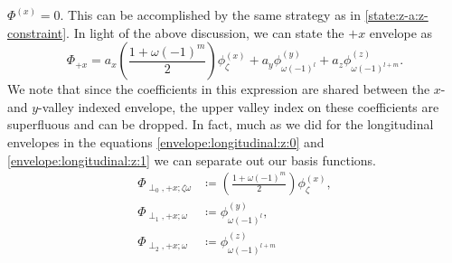 $\Phi^{\left(x\right)} = 0$. This can be accomplished by the same strategy as in
\eqref{state:z-a:z-constraint}. In light of the above discussion, we can state
the $+x$ envelope as 
\begin{equation}
\Phi_{+x}
  =
    a_{x}
    \left(\frac{1+\omega\left(-1\right)^{m}}{2}\right)
    \phi_{ \zeta }^{\left(x\right)}
      +
    a_{y}
    \phi_{ \omega\left(-1\right)^{l} }^{\left(y\right)}
      +
    a_{z}
    \phi_{ \omega\left(-1\right)^{l+m} }^{\left(z\right)}
.
\end{equation}
We note that since the coefficients in this expression are shared between the
$x$- and $y$-valley indexed envelope, the upper valley index on these
coefficients are superfluous and can be dropped. In fact, much as we did for the
longitudinal envelopes in the equations \eqref{envelope:longitudinal:z:0} and
\eqref{envelope:longitudinal:z:1} we can separate out our basis functions.
\begin{align}
\Phi_{\perp_{0},+x;\zeta\omega}
  &\coloneqq
    \left(\frac{1+\omega\left(-1\right)^{m}}{2}\right)
    \phi_{ \zeta }^{\left(x\right)}
,\\
\Phi_{\perp_{1},+x;\omega}
  &\coloneqq
    \phi_{ \omega\left(-1\right)^{l} }^{\left(y\right)}
,\\
\Phi_{\perp_{2},+x;\omega}
  &\coloneqq
    \phi_{ \omega\left(-1\right)^{l+m} }^{\left(z\right)}
\end{align}

